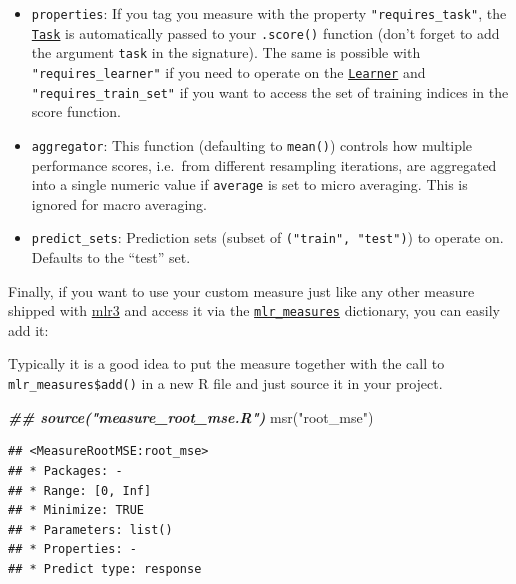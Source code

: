 \documentclass[
]{scrbook}
\newenvironment{Shaded}{\begin{snugshade}}{\end{snugshade}}
\newcommand{\DocumentationTok}[1]{\textcolor[rgb]{0.56,0.35,0.01}{\textbf{\textit{#1}}}}
\newcommand{\FunctionTok}[1]{\textcolor[rgb]{0.00,0.00,0.00}{#1}}
\newcommand{\NormalTok}[1]{#1}
\newcommand{\SpecialCharTok}[1]{\textcolor[rgb]{0.00,0.00,0.00}{#1}}
\newcommand{\StringTok}[1]{\textcolor[rgb]{0.31,0.60,0.02}{#1}}
\providecommand{\tightlist}{%
  \setlength{\itemsep}{0pt}\setlength{\parskip}{0pt}}
\renewenvironment{Shaded} {\begin{snugshade}\small} {\end{snugshade}}
\begin{document}
\begin{itemize}
\tightlist
\item
  \texttt{properties}: If you tag you measure with the property \texttt{"requires\_task"}, the \href{https://mlr3.mlr-org.com/reference/Task.html}{\texttt{Task}} is automatically passed to your \texttt{.score()} function (don't forget to add the argument \texttt{task} in the signature).
  The same is possible with \texttt{"requires\_learner"} if you need to operate on the \href{https://mlr3.mlr-org.com/reference/Learner.html}{\texttt{Learner}} and \texttt{"requires\_train\_set"} if you want to access the set of training indices in the score function.
\item
  \texttt{aggregator}: This function (defaulting to \texttt{mean()}) controls how multiple performance scores, i.e.~from different resampling iterations, are aggregated into a single numeric value if \texttt{average} is set to micro averaging.
  This is ignored for macro averaging.
\item
  \texttt{predict\_sets}: Prediction sets (subset of \texttt{("train",\ "test")}) to operate on.
  Defaults to the ``test'' set.
\end{itemize}

Finally, if you want to use your custom measure just like any other measure shipped with \href{https://mlr3.mlr-org.com}{mlr3} and access it via the \href{https://mlr3.mlr-org.com/reference/mlr_measures.html}{\texttt{mlr\_measures}} dictionary, you can easily add it:

\begin{Shaded}
\end{Shaded}

Typically it is a good idea to put the measure together with the call to \texttt{mlr\_measures\$add()} in a new R file and just source it in your project.

\begin{Shaded}
\begin{Highlighting}[]
\DocumentationTok{\#\# source("measure\_root\_mse.R")}
\FunctionTok{msr}\NormalTok{(}\StringTok{"root\_mse"}\NormalTok{)}
\end{Highlighting}
\end{Shaded}

\begin{verbatim}
## <MeasureRootMSE:root_mse>
## * Packages: -
## * Range: [0, Inf]
## * Minimize: TRUE
## * Parameters: list()
## * Properties: -
## * Predict type: response
\end{verbatim}
\end{document}
